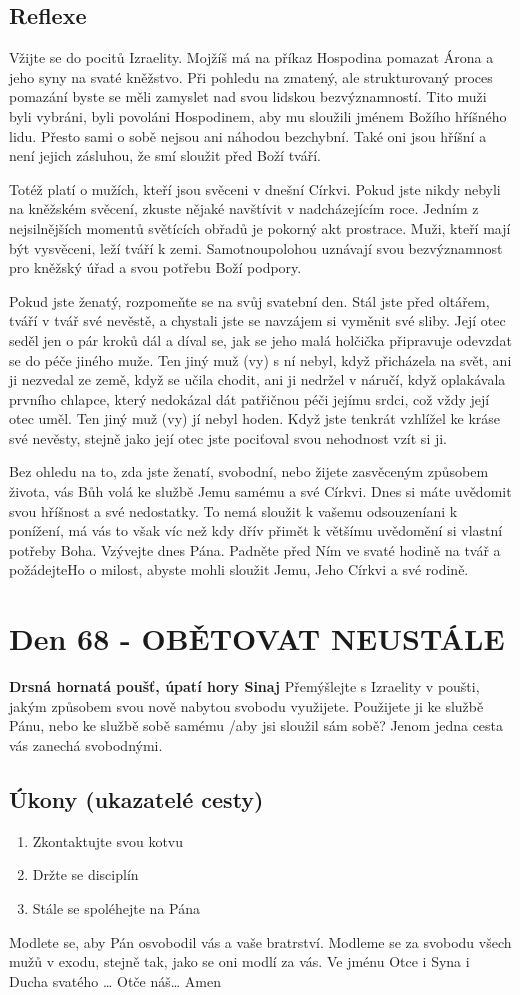 \documentclass[11pt]{article}
\newcommand{\zacatekDesatyTyden}{
\textbf{Drsná hornatá poušť, úpatí hory Sinaj} \newline 
Přemýšlejte s Izraelity v poušti, jakým způsobem svou nově nabytou svobodu využijete. Použijete ji ke službě Pánu, nebo ke službě sobě samému /aby jsi sloužil sám sobě? Jenom jedna cesta vás zanechá svobodnými.

\subsection*{Úkony (ukazatelé cesty)}
\begin{enumerate}
  \item Zkontaktujte svou kotvu
  \item Držte se disciplín
  \item Stále se spoléhejte na Pána
\end{enumerate}
Modlete se, aby Pán osvobodil vás a vaše bratrství. \newline
Modleme se za svobodu všech mužů v exodu, stejně tak, jako se oni modlí za vás.\newline
Ve jménu Otce i Syna i Ducha svatého …  Otče náš… Amen
}
\begin{document}
\subsection*{Reflexe}
Vžijte se do pocitů Izraelity. Mojžíš má na příkaz Hospodina pomazat Árona a jeho syny na svaté kněžstvo. Při
pohledu na zmatený, ale strukturovaný proces pomazání byste se měli zamyslet nad svou lidskou bezvýznamností. Tito
muži byli vybráni, byli povoláni Hospodinem, aby mu sloužili jménem Božího hříšného lidu. Přesto sami o sobě nejsou
ani náhodou bezchybní. Také oni jsou hříšní a není jejich zásluhou, že smí sloužit před Boží tváří.

Totéž platí o mužích, kteří jsou svěceni v dnešní Církvi. Pokud jste nikdy nebyli na kněžském svěcení, zkuste nějaké
navštívit v nadcházejícím roce. Jedním z nejsilnějších momentů světících obřadů je pokorný akt prostrace. Muži, kteří
mají být vysvěceni, leží tváří k zemi. Samotnoupolohou uznávají svou bezvýznamnost pro kněžský úřad a svou potřebu
Boží podpory.

Pokud jste ženatý, rozpomeňte se na svůj svatební den. Stál jste před oltářem, tváří v tvář své nevěstě, a chystali jste se
navzájem si vyměnit své sliby. Její otec seděl jen o pár kroků dál a díval se, jak se jeho malá holčička připravuje
odevzdat se do péče jiného muže. Ten jiný muž (vy) s ní nebyl, když přicházela na svět, ani ji nezvedal ze země, když
se učila chodit, ani ji nedržel v náručí, když oplakávala prvního chlapce, který nedokázal dát patřičnou péči jejímu
srdci, což vždy její otec uměl. Ten jiný muž (vy) jí nebyl hoden. Když jste tenkrát vzhlížel ke kráse své nevěsty, stejně
jako její otec jste pociťoval svou nehodnost vzít si ji.

Bez ohledu na to, zda jste ženatí, svobodní, nebo žijete zasvěceným způsobem života, vás Bůh volá ke službě Jemu
samému a své Církvi. Dnes si máte uvědomit svou hříšnost a své nedostatky. To nemá sloužit k vašemu odsouzeníani k
ponížení, má vás to však víc než kdy dřív přimět k většímu uvědomění si vlastní potřeby Boha. Vzývejte dnes Pána.
Padněte před Ním ve svaté hodině na tvář a požádejteHo o milost, abyste mohli sloužit Jemu, Jeho Církvi a své rodině.





\newpage
\section{Den 68 - OBĚTOVAT NEUSTÁLE}
\zacatekDesatyTyden
\end{document}
